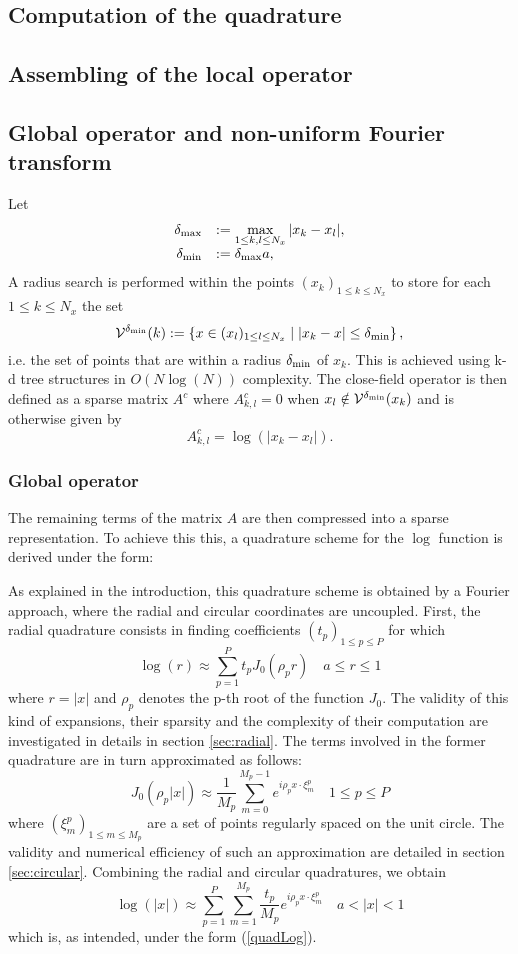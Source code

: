 \documentclass[11pt,a4paper]{article}
\begin{document}
\subsection{Computation of the quadrature}
\subsection{Assembling of the local operator}
\subsection{Global operator and non-uniform Fourier transform}

Let \[\begin{array}{rl}
\delta_{\max} &:= \displaystyle\max_{1 \leq k,l \leq N_x} |x_k - x_l|,\\
\delta_{\min} &:= \delta_{\max} a,\\
\end{array} \] 
A radius search is performed within the points $(x_k)_{1 \leq k \leq N_x}$ to store for each $1 \leq k \leq N_x$ the set 
\[\mathcal{V}^{\delta_{\min}} (k):= \left\{x \in (x_l)_{1 \leq l \leq N_x}\mathrel{}\middle|\mathrel{}|x_k - x|\leq \delta_{\min}\right\},\] 
i.e. the set of points that are within a radius $\delta_{\min}$ of $x_k$. This is achieved using k-d tree structures in $O(N \log (N))$ complexity. The close-field operator is then defined as a sparse matrix $A^c$ where $A^c_{k,l} = 0$ when $x_l \notin \mathcal{V}^{\delta_{\min}}(x_k)$ and is otherwise given by
\[A^{c}_{k,l} = \log(|x_k - x_l|).\]

\subsubsection*{Global operator}

The remaining terms of the matrix $A$ are then compressed into a sparse representation. To achieve this this, a quadrature scheme for the $\log$ function is derived under the form:


As explained in the introduction, this quadrature scheme is obtained by a Fourier approach, where the radial and circular coordinates are uncoupled. 
First, the radial quadrature consists in finding coefficients $(t_p)_{1 \leq p \leq P}$ for which
\[\log(r) \approx \sum_{p=1}^P t_p J_0\left( \rho_p r \right) \quad a \leq r \leq 1\] 
where $r = |x|$ and $\rho_p$ denotes the p-th root of the function $J_0$. The validity of this kind of expansions, their sparsity and the complexity of their computation are investigated in details in section \ref{sec:radial}. 
The terms involved in the former quadrature are in turn approximated as follows: \[J_0\left( \rho_p |x| \right) \approx \frac{1}{M_p}\sum_{m=0}^{M_p-1} e^{i\rho_p x \cdot \xi^p_m} \quad 1\leq p \leq P\] 
where $(\xi_m^p)_{1 \leq m \leq M_p}$ are a set of points regularly spaced on the unit circle. The validity and numerical efficiency of such an approximation are detailed in section \ref{sec:circular}. Combining the radial and circular quadratures, we obtain 
\[\log(|x|) \approx \sum_{p=1}^P\sum_{m=1}^{M_p} \dfrac{t_p}{M_p} e^{i \rho_p x\cdot \xi_m^p} \quad a < |x| < 1\]
which is, as intended, under the form (\ref{quadLog}).
\end{document}
